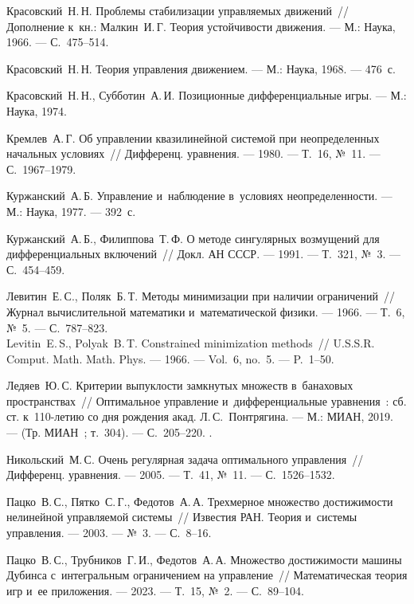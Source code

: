 \documentclass[../main.tex]{subfiles}
\begin{document}
\begin{thebibliography}{99}
Красовский~Н.\,Н. Проблемы стабилизации управляемых движений~// Дополнение к~кн.: Малкин~И.\,Г. Теория устойчивости движения. --- М.: Наука, 1966. --- С.~475--514.

Красовский~Н.\,Н. Теория управления движением. --- М.: Наука, 1968. --- 476~с.

Красовский~Н.\,Н., Субботин~А.\,И. Позиционные дифференциальные игры. --- М.: Наука, 1974.

Кремлев~А.\,Г. Об управлении квазилинейной системой при неопределенных начальных условиях~// Дифференц. уравнения. --- 1980. --- Т.~16, №~11. --- С.~1967--1979.

Куржанский~А.\,Б. Управление и~наблюдение в~условиях неопределенности. --- М.: Наука, 1977. --- 392~с.

Куржанский~А.\,Б., Филиппова~Т.\,Ф. О методе сингулярных возмущений для дифференциальных включений~// Докл. АН СССР. --- 1991. --- Т.~321, №~3. --- С.~454--459.

Левитин~Е.\,С., Поляк~Б.\,Т. Методы минимизации при наличии ограничений~// Журнал вычислительной математики и~математической физики. --- 1966. --- Т.~6, №~5. --- С.~787--823.
\\
Levitin~E.\,S., Polyak~B.\,T. Constrained minimization methods~// U.S.S.R. Comput. Math. Math. Phys. --- 1966. --- Vol.~6, no.~5. --- P.~1--50. 

Ледяев~Ю.\,С. Критерии выпуклости замкнутых множеств в~банаховых пространствах~// Оптимальное управление и~дифференциальные уравнения~: сб. ст. к~110-летию со дня рождения акад. Л.\,С.~Понтрягина. --- М.: МИАН, 2019. --- (Тр. МИАН~; т.~304). --- С.~205--220. 
.

Никольский~М.\,С. Очень регулярная задача оптимального управления~// Дифференц. уравнения. --- 2005. --- Т.~41, №~11. --- С.~1526--1532.

Пацко~В.\,С., Пятко~С.\,Г., Федотов~А.\,А. Трехмерное множество достижимости нелинейной управляемой системы~// Известия РАН. Теория и~системы управления. --- 2003. --- №~3. --- С.~8--16.

Пацко~В.\,С., Трубников~Г.\,И., Федотов~А.\,А. Множество достижимости машины Дубинса с~интегральным ограничением на управление~// Математическая теория игр и~ее приложения. --- 2023. --- Т.~15, №~2. --- С.~89--104.


\end{thebibliography}
\end{document}
